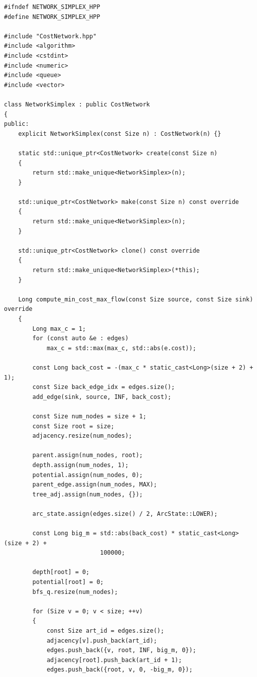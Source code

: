 \documentclass[12pt,a4paper]{article}
\begin{document}
\newpage

\label{ap:network_simplex}

\begin{lstlisting}[caption={Implementação em C++ do algoritmo \textit{Network Simplex}.}, label={lst:network_simplex}]
#ifndef NETWORK_SIMPLEX_HPP
#define NETWORK_SIMPLEX_HPP

#include "CostNetwork.hpp"
#include <algorithm>
#include <cstdint>
#include <numeric>
#include <queue>
#include <vector>

class NetworkSimplex : public CostNetwork
{
public:
	explicit NetworkSimplex(const Size n) : CostNetwork(n) {}

	static std::unique_ptr<CostNetwork> create(const Size n)
	{
		return std::make_unique<NetworkSimplex>(n);
	}

	std::unique_ptr<CostNetwork> make(const Size n) const override
	{
		return std::make_unique<NetworkSimplex>(n);
	}

	std::unique_ptr<CostNetwork> clone() const override
	{
		return std::make_unique<NetworkSimplex>(*this);
	}

	Long compute_min_cost_max_flow(const Size source, const Size sink) override
	{
		Long max_c = 1;
		for (const auto &e : edges)
			max_c = std::max(max_c, std::abs(e.cost));

		const Long back_cost = -(max_c * static_cast<Long>(size + 2) + 1);
		const Size back_edge_idx = edges.size();
		add_edge(sink, source, INF, back_cost);

		const Size num_nodes = size + 1;
		const Size root = size;
		adjacency.resize(num_nodes);

		parent.assign(num_nodes, root);
		depth.assign(num_nodes, 1);
		potential.assign(num_nodes, 0);
		parent_edge.assign(num_nodes, MAX);
		tree_adj.assign(num_nodes, {});

		arc_state.assign(edges.size() / 2, ArcState::LOWER);

		const Long big_m = std::abs(back_cost) * static_cast<Long>(size + 2) +
		                   100000;

		depth[root] = 0;
		potential[root] = 0;
		bfs_q.resize(num_nodes);

		for (Size v = 0; v < size; ++v)
		{
			const Size art_id = edges.size();
			adjacency[v].push_back(art_id);
			edges.push_back({v, root, INF, big_m, 0});
			adjacency[root].push_back(art_id + 1);
			edges.push_back({root, v, 0, -big_m, 0});


\end{lstlisting}
\end{document}
